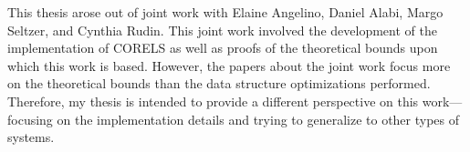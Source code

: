 \newpage

This thesis arose out of joint work with Elaine Angelino, Daniel Alabi, Margo Seltzer, and Cynthia Rudin.
This joint work involved the development of the implementation of CORELS as well as proofs of the theoretical bounds upon which this work is based.
However, the papers about the joint work focus more on the theoretical bounds than the data structure optimizations performed.
Therefore, my thesis is intended to provide a different perspective on this work---focusing on the implementation details and trying to generalize to other types of systems.